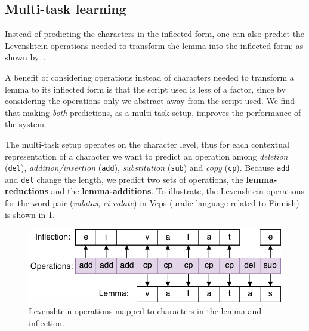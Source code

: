 \documentclass[11pt,a4paper]{article}
\begin{document}

\subsection{Multi-task learning}

Instead of predicting the characters in the inflected form, one can
also predict the Levenshtein operations needed to transform the lemma
into the inflected form; as shown by~.

A benefit of considering operations instead of characters needed to
transform a lemma to its inflected form is that the script used is
less of a factor, since by considering the operations only we abstract
away from the script used. We find that making \emph{both}
predictions, as a multi-task setup, improves the performance of the
system.

The multi-task setup operates on the character level, thus for each
contextual representation of a character we want to predict an
operation among \textit{deletion} (\texttt{del}),
\textit{addition/insertion} (\texttt{add}), \textit{substitution}
(\texttt{sub}) and \textit{copy} (\texttt{cp}). Because \texttt{add}
and \texttt{del} change the length, we predict two sets of operations,
the \textbf{lemma-reductions} and the \textbf{lemma-additions}. To
illustrate, the Levenshtein operations for the word pair
(\emph{valatas}, \emph{ei valate}) in Veps (uralic language related to
Finnish) is shown in \cref{fig:ops}.


\begin{figure}[ht]
\centering
\includegraphics[scale=0.5]{ops.pdf}
\caption{\label{fig:ops} Levenshtein operations mapped to characters in the lemma and
inflection.}
\end{figure}
\end{document}
